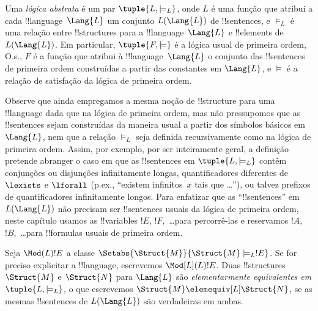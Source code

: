 \documentclass[../../../include/open-logic-section]{subfiles}
\begin{document}

\begin{defn}
Uma \emph{lógica abstrata} é um par $\tuple{L, \models_L}$, onde $L$ é
uma função que atribui a cada !!{language}~$\Lang{L}$ um conjunto
$L(\Lang{L})$ de !!{sentence}s, e $\models_L$ é uma relação entre
!!{structure}s para a !!{language}~$\Lang{L}$ e !!{element}s de
$L(\Lang{L})$. Em particular, $\tuple{F, \models}$ é a lógica usual de
primeira ordem, O.s.\@, $F$ é a função que atribui à
!!{language}~$\Lang{L}$ o conjunto das !!{sentence}s de primeira ordem
construídas a partir das constantes em $\Lang{L}$, e $\models$ é a
relação de satisfação da lógica de primeira ordem.
\end{defn}

Observe que ainda empregamos a mesma noção de !!{structure} para uma
!!{language} dada que na lógica de primeira ordem, mas não pressupomos
que as !!{sentence}s sejam construídas da maneira usual a partir dos
símbolos básicos em $\Lang{L}$, nem que a relação $\models_L$ seja
definida recursivamente como na lógica de primeira ordem. Assim, por
exemplo, por ser inteiramente geral, a definição pretende abranger o
caso em que as !!{sentence}s em $\tuple{L,\models_L}$ contêm conjunções
ou disjunções infinitamente longas, quantificadores diferentes de
$\lexists$ e $\lforall$ (p.ex., ``existem infinitos~$x$ tais
que \dots''), ou talvez prefixos de quantificadores infinitamente
longos. Para enfatizar que as ``!!{sentence}s'' em $L(\Lang{L})$ não
precisam ser !!{sentence}s usuais da lógica de primeira ordem, neste
capítulo usamos as !!{variable}s $!E$, $!F$,~\dots para percorrê-las e
reservamos $!A$, $!B$,~\dots para !!{formula}s usuais de primeira ordem.

\begin{defn}
Seja $\Mod(L){!E}$ a classe $\Setabs{\Struct{M}}{\Struct{M}
  \models_L !E}$. Se for preciso explicitar a !!{language}, escrevemos
$\Mod[L](L){!E}$. Duas !!{structure}s $\Struct{M}$ e $\Struct{N}$ para
$\Lang{L}$ são \emph{elementarmente equivalentes em}
$\tuple{L, \models_L}$, o que escrevemos
$\Struct{M} \elemequiv[L] \Struct{N}$, se as mesmas !!{sentence}s de
$L(\Lang{L})$ são verdadeiras em ambas.
\end{defn}
\end{document}
